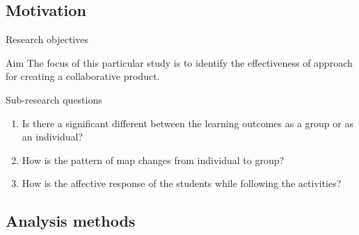 \subsection{Motivation}
\begin{frame}{Research objectives}

\begin{block}{Aim}
    The focus of this particular study is to identify the effectiveness
    of approach for creating a collaborative product.
\end{block}

\begin{alertblock}{Sub-research questions}
    \begin{enumerate}
        \item Is there a significant different between the learning outcomes as a group
        or as an individual?
        \item How is the pattern of map changes from individual to group?
        \item How is the affective response of the students while following the activities?
\end{enumerate}
\end{alertblock}

\end{frame}

\subsection{Analysis methods}


